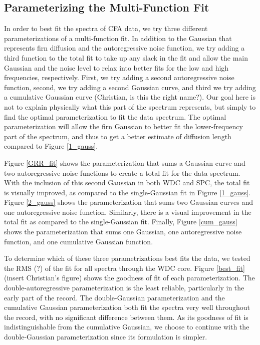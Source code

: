\documentclass[draft, jgrga]{AGUTeX}
\begin{document}
\begin{article}


\section{Parameterizing the Multi-Function Fit}
In order to best fit the spectra of CFA data, we try three different parameterizations of a multi-function fit. In addition to the Gaussian that represents firn diffusion and the autoregressive noise function, we try adding a third function to the total fit to take up any slack in the fit and allow the main Gaussian and the noise level to relax into better fits for the low and high frequencies, respectively. First, we try adding a second autoregressive noise function, second, we try adding a second Gaussian curve, and third we try adding a cumulative Gaussian curve (Christian, is this the right name?). Our goal here is not to explain physically what this part of the spectrum represents, but simply to find the optimal parameterization to fit the data spectrum. The optimal parameterization will allow the firn Gaussian to better fit the lower-frequency part of the spectrum, and thus to get a better estimate of diffusion length compared to Figure \ref{1_gauss}.

Figure \ref{GRR_fit} shows the parameterization that sums a Gaussian curve and two autoregressive noise functions to create a total fit for the data spectrum. With the inclusion of this second Gaussian in both WDC and SPC, the total fit is visually improved, as compared to the single-Gaussian fit in Figure \ref{1_gauss}. Figure \ref{2_gauss} shows the parameterization that sums two Gaussian curves and one autoregressive noise function. Similarly, there is a visual improvement in the total fit as compared to the single-Gaussian fit. Finally, Figure \ref{cum_gauss} shows the parameterization that sums one Gaussian, one autoregressive noise function, and one cumulative Gaussian function.

To determine which of these three parametrizations best fits the data, we tested the RMS (?) of the fit for all spectra through the WDC core. Figure \ref{best_fit} (insert Christian's figure) shows the goodness of fit of each parameterization. The double-autoregressive parameterization is the least reliable, particularly in the early part of the record. The double-Gaussian parameterization and the cumulative Gaussian parameterization both fit the spectra very well throughout the record, with no significant difference between them. As its goodness of fit is indistinguishable from the cumulative Gaussian, we choose to continue with the double-Gaussian parameterization since its formulation is simpler.



\end{article}
\end{document}
